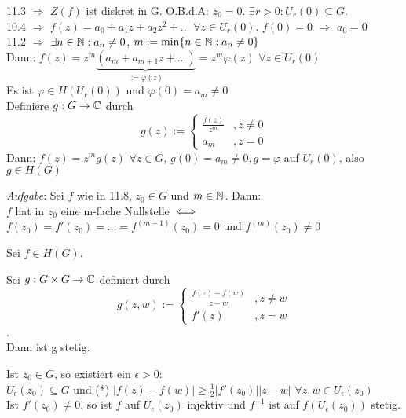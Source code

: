 \documentclass[a4paper,twoside,DIV15,BCOR12mm]{scrbook}
\begin{document}
\begin{beweis}
11.3 $\Rightarrow $ $Z(f)$ ist diskret in G. O.B.d.A: $z_0 = 0$. $\exists r > 0:
U_r(0) \subseteq G.$ \\
10.4 $\Rightarrow$ $f(z) = a_0 + a_1z + a_2 z^2 + \dots$ $\forall z \in U_r(0)$.
 $f(0) = 0 $ $\Rightarrow$ $a_0 = 0$ \\
11.2 $\Rightarrow $ $\exists n \in \mathbb{N}: a_n \neq 0$, $m := \min \{n \in \mathbb{N}:
a_n \neq 0\}$ \\
Dann: $f(z) = z^m \underbrace{(a_m + a_{m+1}z + \dots)}_{:= \varphi(z)} = z^m 
\varphi(z)$ $\forall z \in U_r(0)$ \\
Es ist $\varphi \in H(U_r(0))$ und $\varphi(0) = a_m \neq 0$ \\
Definiere $g: G \to \mathbb{C}$ durch 
\[g(z) := \begin{cases}
         	\frac{f(z)}{z^m} &, z \neq 0 \\
         	a_m              &, z = 0 
         \end{cases} \]
Dann: $f(z) = z^m g(z)$ $\forall z \in G$, $g(0) = a_m \neq 0, g = \varphi$ auf
$U_r(0)$, also $g \in H(G)$
\end{beweis}
\emph{Aufgabe}: Sei $f$ wie in 11.8, $z_0 \in G$ und $m \in \mathbb{N}$. Dann: \\ $f$
hat in $z_0$ eine m-fache Nullstelle $\iff$ $f(z_0) = f'(z_0) = \ldots =
f^{(m-1)}(z_0)=0$ und $f^{(m)}(z_0) \neq 0$

\begin{satz}
Sei $f \in H(G)$.
\begin{liste}
\item Sei $g: G \times G \to \mathbb{C}$ definiert durch 
\[g(z,w):= \begin{cases} 
           \frac{f(z)-f(w)}{z-w}&, z \neq w \\
           f'(z)&, z = w
           \end{cases}\]. \\
Dann ist g stetig.
\item Ist $z_0 \in G$, so existiert ein $\epsilon > 0$: \\ $ U_\epsilon(z_0)
\subseteq G$ und (*) $|f(z)-f(w)| \geq \frac{1}{2}|f'(z_0)||z-w|$ $\forall z, w
\in U_\epsilon(z_0)$ \\ Ist $f'(z_0) \neq 0$, so ist $f$ auf $U_\epsilon(z_0)$
injektiv und $f^{-1}$ ist auf $f(U_{\epsilon}(z_0))$ stetig.

\end{liste}
\end{satz}
\end{document}
